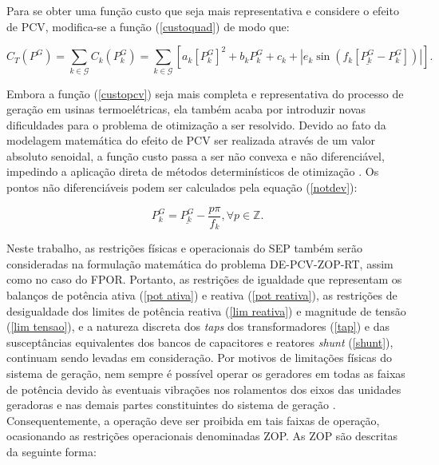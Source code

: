 \documentclass[
	12pt,				%
	openany,			%
	twoside,			%
	a4paper,			%
	chapter=TITLE,		%
	section=Title,		%
	subsection=Title,	%
	subsubsection=Title,%
	english,			%
	french,				%
	spanish,			%
	brazil			%
	]{abntex2}
\newcommand{\Z}{\mathbb{Z}}
\begin{document}
\begin{ERRATA}
Para se obter uma função custo que seja mais representativa e considere o efeito de PCV, modifica-se a função (\ref{custoquad}) de modo que:

\begin{equation} \label{custopcv}
C_T(P^{G}) = \sum_{k \in \mathcal{G}} C_k(P^{G}_k) = \sum_{k \in \mathcal{G}} [a_k[P^{G}_k]^2 + b_kP^{G}_k + c_k + |e_k\sin(f_k[\underline{P^{G}_k}-P^{G}_k])|].
\end{equation}

Embora a função (\ref{custopcv}) seja mais completa e representativa do processo de geração em usinas termoelétricas, ela também acaba por introduzir novas dificuldades para o problema de otimização a ser resolvido. Devido ao fato da modelagem matemática do efeito de PCV ser realizada através de um valor absoluto senoidal, a função custo passa a ser não convexa e não diferenciável, impedindo a aplicação direta de métodos determinísticos de otimização \cite{dissertacaodiego}. Os pontos não diferenciáveis podem ser calculados pela equação (\ref{notdev}):

\begin{equation} \label{notdev}
P^{G}_{k} = \underline{P^{G}_{k}} - \frac{p\pi}{f_k},  \forall  p \in \Z.
\end{equation}

Neste trabalho, as restrições físicas e operacionais do SEP também serão consideradas na formulação matemática do problema DE-PCV-ZOP-RT, assim como no caso do FPOR. Portanto, as restrições de igualdade que representam os balanços de potência ativa (\ref{pot ativa}) e reativa (\ref{pot reativa}), as restrições de desigualdade dos limites de potência reativa  (\ref{lim reativa}) e magnitude de tensão (\ref{lim tensao}), e a natureza discreta dos \emph{taps} dos transformadores (\ref{tap}) e das susceptâncias equivalentes dos bancos de capacitores e reatores \emph{shunt} (\ref{shunt}), continuam sendo levadas em consideração. Por motivos de limitações físicas do sistema de geração, nem sempre é possível operar os geradores em todas as faixas de potência devido às eventuais vibrações nos rolamentos dos eixos das unidades geradoras e nas demais partes constituintes do sistema de geração \cite{abbas}. Consequentemente, a operação deve ser proibida em tais faixas de operação, ocasionando as restrições operacionais denominadas ZOP. As ZOP são descritas da seguinte forma:





\end{ERRATA}
\end{document}

